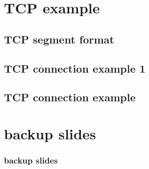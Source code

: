 

\section{TCP example}

\subsection{TCP segment format}


\subsection{TCP connection example 1}


\subsection{TCP connection example}




\section{backup slides}
\begin{frame}\frametitle{backup slides}
\end{frame}



